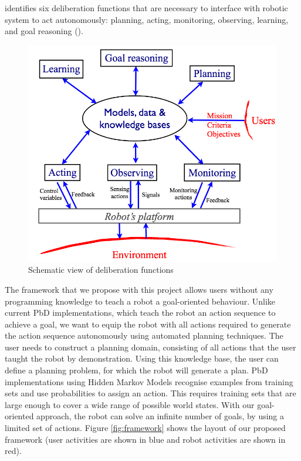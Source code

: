 \cite{ingrand2017deliberation} identifies six deliberation functions that are necessary to interface with robotic system to act autonomously: planning, acting, monitoring, observing, learning, and goal reasoning ().

\begin{figure}[h]
	\centering
	\includegraphics[scale=0.50]{figures/deliberationfunctions}
	\caption{Schematic view of deliberation functions \cite{ingrand2017deliberation}}
	\label{fig:deliberationfunctions}
\end{figure}

The framework that we propose with this project allows users without any programming knowledge to teach a robot a goal-oriented behaviour. 
Unlike current PbD implementations, which teach the robot an action sequence to achieve a goal, we want to equip the robot with all actions required to generate the action sequence autonomously using automated planning techniques. The user needs to construct a planning domain, consisting of all actions that the user taught the robot by demonstration.
 Using this knowledge base, the user can define a planning problem, for which the robot will generate a plan.
 PbD implementations using Hidden Markov Models recognise examples from training sets and use probabilities to assign an action.
 This requires training sets that are large enough to cover a wide range of possible world states.
 With our goal-oriented approach, the robot can solve an infinite number of goals, by using a limited set of actions.
 Figure \ref{fig:framework} shows the layout of our proposed framework (user activities are shown in blue and robot activities are shown in red).
 

